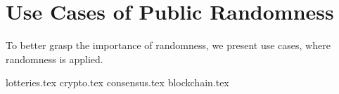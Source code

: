 \section{Use Cases of Public Randomness}\label{sec:use_cases_of_public_randomness}
To better grasp the importance of randomness, we present use cases, where randomness is applied.

{lotteries.tex}
{crypto.tex}
{consensus.tex}
{blockchain.tex}
